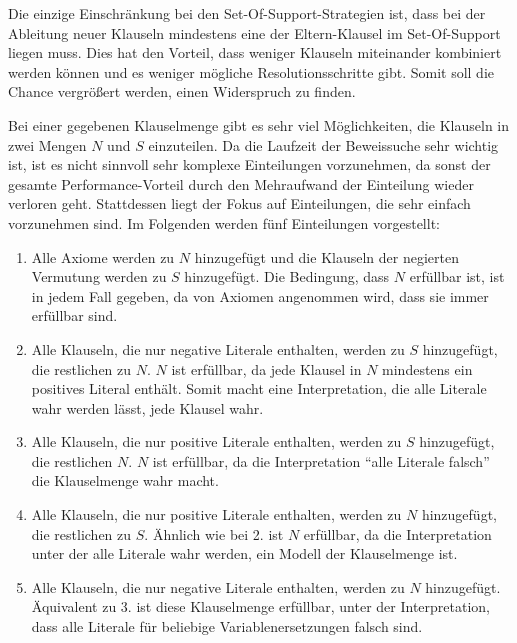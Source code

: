 Die einzige Einschränkung bei den Set-Of-Support-Strategien ist, dass bei der Ableitung neuer Klauseln mindestens eine der Eltern-Klausel im Set-Of-Support liegen muss. Dies hat den Vorteil, dass weniger Klauseln miteinander kombiniert werden können und es weniger mögliche Resolutionsschritte gibt. Somit soll die Chance vergrößert werden, einen Widerspruch zu finden.

Bei einer gegebenen Klauselmenge gibt es sehr viel Möglichkeiten, die Klauseln in zwei Mengen $N$ und $S$ einzuteilen. Da die Laufzeit der Beweissuche sehr wichtig ist, ist es nicht sinnvoll sehr komplexe Einteilungen vorzunehmen, da sonst der gesamte Performance-Vorteil durch den Mehraufwand der Einteilung wieder verloren geht. Stattdessen liegt der Fokus auf Einteilungen, die sehr einfach vorzunehmen sind. Im Folgenden werden fünf Einteilungen vorgestellt:
\begin{enumerate}
	\item Alle Axiome werden zu $N$ hinzugefügt und die Klauseln der negierten Vermutung werden zu $S$ hinzugefügt. Die Bedingung, dass $N$ erfüllbar ist, ist in jedem Fall gegeben, da von Axiomen angenommen wird, dass sie immer erfüllbar sind.
	\item Alle Klauseln, die nur negative Literale enthalten, werden zu $S$ hinzugefügt, die restlichen zu $N$. $N$ ist erfüllbar, da jede Klausel in $N$ mindestens ein positives Literal enthält. Somit macht eine Interpretation, die alle Literale wahr werden lässt, jede Klausel wahr.
	\item Alle Klauseln, die nur positive Literale enthalten, werden zu $S$ hinzugefügt, die restlichen $N$. $N$ ist erfüllbar, da die Interpretation "`alle Literale falsch"' die Klauselmenge wahr macht.
	\item Alle Klauseln, die nur positive Literale enthalten, werden zu $N$ hinzugefügt, die restlichen zu $S$. Ähnlich wie bei 2. ist $N$ erfüllbar, da die Interpretation unter der alle Literale wahr werden, ein Modell der Klauselmenge ist.
	\item Alle Klauseln, die nur negative Literale enthalten, werden zu $N$ hinzugefügt. Äquivalent zu 3. ist diese Klauselmenge erfüllbar, unter der Interpretation, dass alle Literale für beliebige Variablenersetzungen falsch sind.
\end{enumerate}

	
